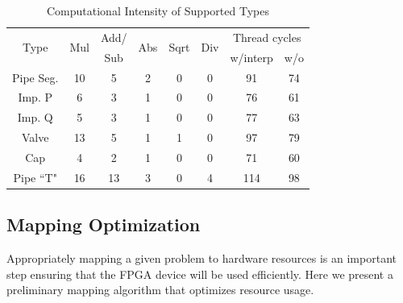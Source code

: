 \begin{center}
\begin{table}
\caption{Computational Intensity of Supported Types}
\begin{tabular}{|c|c|c|c|c|c|c|c|}
\hline
\multirow{2}{*}{Type}	&\multirow{2}{*}{Mul}	&Add/	&\multirow{2}{*}{Abs}	&\multirow{2}{*}{Sqrt}	&\multirow{2}{*}{Div}	&\multicolumn{2}{c|}{Thread cycles} \\ \cline{7-8}
 			& 		&Sub 	& 		&		&		&w/interp	&w/o \\ 
\hline \hline
Pipe Seg.	&10 	&5 		&2		&0 		&0		&  91		& 74 \\ 
\hline
Imp. P 		&6 		&3 		&1		&0 		&0		&  76		& 61 \\ 
\hline
Imp. Q 		&5 		&3 		&1		&0 		&0		&	77		& 63 \\ 
\hline
Valve 		&13 	&5 		&1		&1 		&0		&	97		& 79 \\ 
\hline
Cap 		&4 		&2 		&1		&0 		&0		&	71		& 60 \\ 
\hline
Pipe ``T" 	&16 	&13 		&3		&0 		&4		&	114		& 98 \\ 
\hline  
\end{tabular}
\label{InstructionCount}
\end{table}
\end{center}

\subsection{Mapping Optimization}
\label{sec:mapping}

	Appropriately mapping a given problem to hardware resources is an important step ensuring that the FPGA device will be used efficiently. Here we present a preliminary mapping algorithm that optimizes resource usage.
	  
